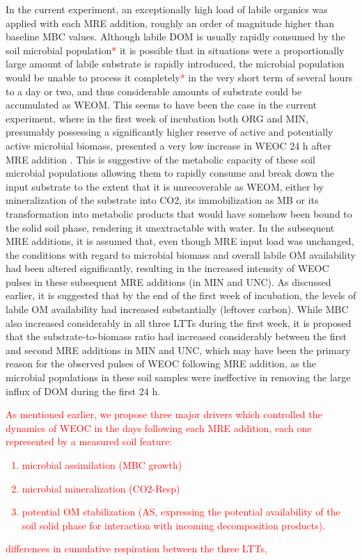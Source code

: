 \documentclass[12pt]{report}
\newcommand{\myRed}[1]{\textcolor{red}{#1}} %
\begin{document}
	 	In the current experiment, an exceptionally high load of labile organics was applied with each MRE addition, roughly an order of magnitude higher than baseline MBC values.  Although labile DOM is usually rapidly consumed by the soil microbial population\myRed{*} it is possible that in situations were a proportionally large amount of labile substrate is rapidly introduced, the microbial population would be unable to process it completely\myRed{*} in the very short term of several hours to a day or two, and thus considerable amounts of substrate could be accumulated as WEOM. This seems to have been the case in the current experiment, where in the first week of incubation both ORG and MIN, presumably possessing a significantly higher reserve of active and potentially active microbial biomass, presented a very low increase in WEOC 24 h after MRE addition . This is suggestive of the metabolic capacity of these soil microbial populations allowing them to rapidly consume and break down the input substrate to the extent that it is unrecoverable as WEOM, either by mineralization of the substrate into CO2, its immobilization as MB or its transformation into metabolic products that would have somehow been bound to the solid soil phase, rendering it unextractable with water. In the subsequent MRE additions, it is assumed that, even though MRE input load was unchanged, the conditions with regard to microbial biomass and overall labile OM availability had been altered significantly, resulting in the increased intensity of WEOC pulses in these subsequent MRE additions (in MIN and UNC). As discussed earlier, it is suggested that by the end of the first week of incubation, the levels of labile OM availability had increased substantially (leftover carbon). While MBC also increased  considerably in all three LTTs during the first week, it is proposed that the substrate-to-biomass  ratio had increased considerably between the first and second MRE additions in MIN and UNC, which may have been the primary reason for the observed pulses of WEOC following MRE addition, as the microbial populations in these soil samples were ineffective in removing the large influx of DOM during the first 24 h. 
		
\myRed{		As mentioned earlier, we propose three  major drivers which controlled the dynamics of WEOC in the days following each MRE addition, each one represented by a measured soil feature:
		\begin{enumerate}
			\item microbial assimilation (MBC growth)
			\item microbial mineralization (CO2-Resp) 
			\item potential  OM stabilization (AS, expressing the potential availability of the soil solid phase for interaction with incoming decomposition products).
		\end{enumerate}
		differences in cumulative respiration between the three LTTs, 
}			
		
\end{document}
